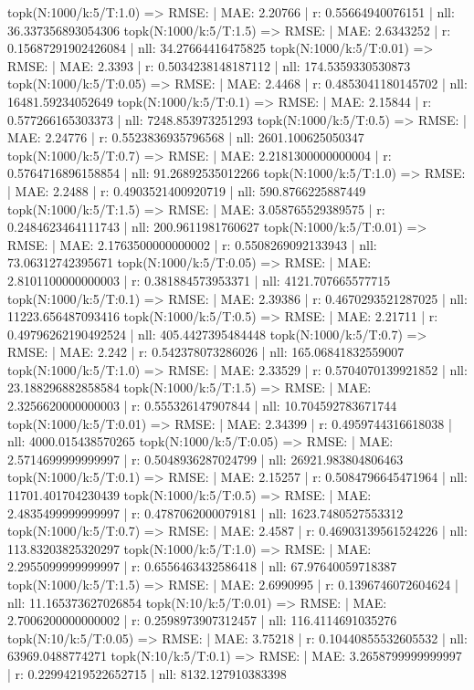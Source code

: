 topk(N:1000/k:5/T:1.0) => RMSE: | MAE: 2.20766 | r: 0.55664940076151 | nll: 36.337356893054306
topk(N:1000/k:5/T:1.5) => RMSE: | MAE: 2.6343252 | r: 0.15687291902426084 | nll: 34.27664416475825
topk(N:1000/k:5/T:0.01) => RMSE: | MAE: 2.3393 | r: 0.5034238148187112 | nll: 174.5359330530873
topk(N:1000/k:5/T:0.05) => RMSE: | MAE: 2.4468 | r: 0.4853041180145702 | nll: 16481.59234052649
topk(N:1000/k:5/T:0.1) => RMSE: | MAE: 2.15844 | r: 0.577266165303373 | nll: 7248.853973251293
topk(N:1000/k:5/T:0.5) => RMSE: | MAE: 2.24776 | r: 0.5523836935796568 | nll: 2601.100625050347
topk(N:1000/k:5/T:0.7) => RMSE: | MAE: 2.2181300000000004 | r: 0.5764716896158854 | nll: 91.26892535012266
topk(N:1000/k:5/T:1.0) => RMSE: | MAE: 2.2488 | r: 0.4903521400920719 | nll: 590.8766225887449
topk(N:1000/k:5/T:1.5) => RMSE: | MAE: 3.058765529389575 | r: 0.2484623464111743 | nll: 200.9611981760627
topk(N:1000/k:5/T:0.01) => RMSE: | MAE: 2.1763500000000002 | r: 0.5508269092133943 | nll: 73.06312742395671
topk(N:1000/k:5/T:0.05) => RMSE: | MAE: 2.8101100000000003 | r: 0.381884573953371 | nll: 4121.707665577715
topk(N:1000/k:5/T:0.1) => RMSE: | MAE: 2.39386 | r: 0.4670293521287025 | nll: 11223.656487093416
topk(N:1000/k:5/T:0.5) => RMSE: | MAE: 2.21711 | r: 0.49796262190492524 | nll: 405.4427395484448
topk(N:1000/k:5/T:0.7) => RMSE: | MAE: 2.242 | r: 0.542378073286026 | nll: 165.06841832559007
topk(N:1000/k:5/T:1.0) => RMSE: | MAE: 2.33529 | r: 0.5704070139921852 | nll: 23.188296882858584
topk(N:1000/k:5/T:1.5) => RMSE: | MAE: 2.3256620000000003 | r: 0.555326147907844 | nll: 10.704592783671744
topk(N:1000/k:5/T:0.01) => RMSE: | MAE: 2.34399 | r: 0.4959744316618038 | nll: 4000.015438570265
topk(N:1000/k:5/T:0.05) => RMSE: | MAE: 2.5714699999999997 | r: 0.5048936287024799 | nll: 26921.983804806463
topk(N:1000/k:5/T:0.1) => RMSE: | MAE: 2.15257 | r: 0.5084796645471964 | nll: 11701.401704230439
topk(N:1000/k:5/T:0.5) => RMSE: | MAE: 2.4835499999999997 | r: 0.4787062000079181 | nll: 1623.7480527553312
topk(N:1000/k:5/T:0.7) => RMSE: | MAE: 2.4587 | r: 0.46903139561524226 | nll: 113.83203825320297
topk(N:1000/k:5/T:1.0) => RMSE: | MAE: 2.2955099999999997 | r: 0.6556463432586418 | nll: 67.97640059718387
topk(N:1000/k:5/T:1.5) => RMSE: | MAE: 2.6990995 | r: 0.1396746072604624 | nll: 11.165373627026854
topk(N:10/k:5/T:0.01) => RMSE: | MAE: 2.7006200000000002 | r: 0.2598973907312457 | nll: 116.4114691035276
topk(N:10/k:5/T:0.05) => RMSE: | MAE: 3.75218 | r: 0.10440855532605532 | nll: 63969.0488774271
topk(N:10/k:5/T:0.1) => RMSE: | MAE: 3.2658799999999997 | r: 0.22994219522652715 | nll: 8132.127910383398
